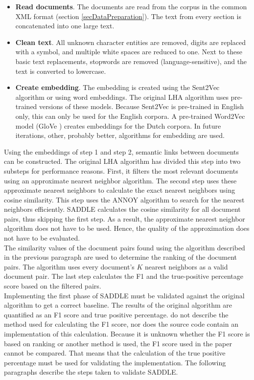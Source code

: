 \begin{itemize}
  \item {\textbf{Read documents}}. The documents are read from the corpus in the common XML format (section \ref{secDataPreparation}). The text from every section is concatenated into one large text. 
  \item {\textbf{Clean text}}. All unknown character entities are removed, digits are replaced with a symbol, and multiple white spaces are reduced to one. Next to these basic text replacements, stopwords are removed (language-sensitive), and the text is converted to lowercase.
\item{\textbf{Create embedding}}. The embedding is created using the Sent2Vec algorithm or using word embeddings. The original LHA algorithm uses pre-trained versions of these models. Because Sent2Vec is pre-trained in English only, this can only be used for the  English corpora. A pre-trained Word2Vec model (GloVe \citep{glove}) creates embeddings for the Dutch corpora. In future iterations, other, probably better, algorithms for embedding are used.
\end{itemize}

Using the embeddings of step 1 and step 2, semantic links between documents can be constructed. The original LHA algorithm has divided this step into two substeps for performance reasons. First, it filters the most relevant documents using an approximate nearest neighbor algorithm. The second step uses these approximate nearest neighbors to calculate the exact nearest neighbors using cosine similarity. This step uses the ANNOY algorithm to search for the nearest neighbors efficiently. SADDLE calculates the cosine similarity for all document pairs, thus skipping the first step. As a result, the approximate nearest neighbor algorithm does not have to be used. Hence, the quality of the approximation does not have to be evaluated.\\

The similarity values of the document pairs found using the algorithm described in the previous paragraph are used to determine the ranking of the document pairs. The algorithm uses every document's $K$ nearest neighbors as a valid document pair. The last step calculates the F1 and the true-positive percentage score based on the filtered pairs.\\

Implementing the first phase of SADDLE must be validated against the original algorithm to get a correct baseline. The results of the original algorithm are quantified as an F1 score and true positive percentage. \cite{nikolov2018large} do not describe the method used for calculating the F1 score, nor does the source code contain an implementation of this calculation. Because it is unknown whether the F1 score is based on ranking or another method is used, the F1 score used in the paper cannot be compared. That means that the calculation of the true positive percentage must be used for validating the implementation. The following paragraphs describe the steps taken to validate SADDLE.\\

